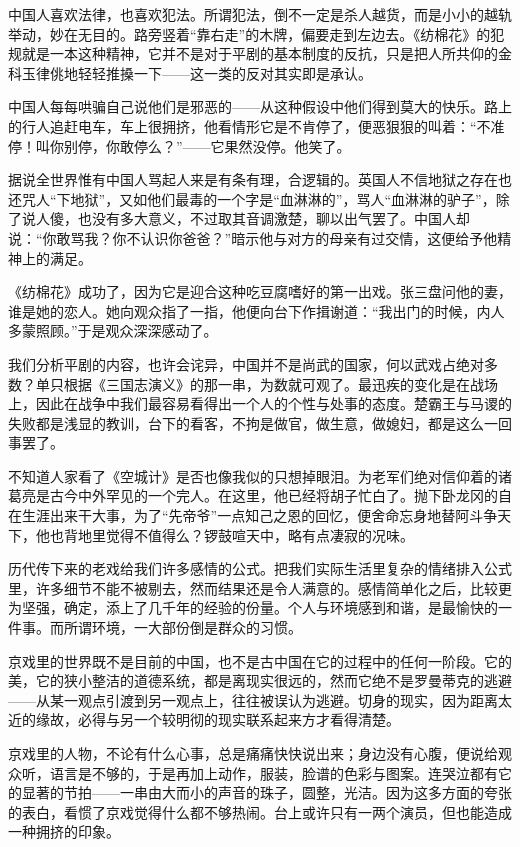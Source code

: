 \par 中国人喜欢法律，也喜欢犯法。所谓犯法，倒不一定是杀人越货，而是小小的越轨举动，妙在无目的。路旁竖着“靠右走”的木牌，偏要走到左边去。《纺棉花》的犯规就是一本这种精神，它并不是对于平剧的基本制度的反抗，只是把人所共仰的金科玉律佻地轻轻推搡一下——这一类的反对其实即是承认。
\par 中国人每每哄骗自己说他们是邪恶的——从这种假设中他们得到莫大的快乐。路上的行人追赶电车，车上很拥挤，他看情形它是不肯停了，便恶狠狠的叫着：“不准停！叫你别停，你敢停么？”——它果然没停。他笑了。
\par 据说全世界惟有中国人骂起人来是有条有理，合逻辑的。英国人不信地狱之存在也还咒人“下地狱”，又如他们最毒的一个字是“血淋淋的”，骂人“血淋淋的驴子”，除了说人傻，也没有多大意义，不过取其音调激楚，聊以出气罢了。中国人却说：“你敢骂我？你不认识你爸爸？”暗示他与对方的母亲有过交情，这便给予他精神上的满足。
\par 《纺棉花》成功了，因为它是迎合这种吃豆腐嗜好的第一出戏。张三盘问他的妻，谁是她的恋人。她向观众指了一指，他便向台下作揖谢道：“我出门的时候，内人多蒙照顾。”于是观众深深感动了。
\par 我们分析平剧的内容，也许会诧异，中国并不是尚武的国家，何以武戏占绝对多数？单只根据《三国志演义》的那一串，为数就可观了。最迅疾的变化是在战场上，因此在战争中我们最容易看得出一个人的个性与处事的态度。楚霸王与马谡的失败都是浅显的教训，台下的看客，不拘是做官，做生意，做媳妇，都是这么一回事罢了。
\par 不知道人家看了《空城计》是否也像我似的只想掉眼泪。为老军们绝对信仰着的诸葛亮是古今中外罕见的一个完人。在这里，他已经将胡子忙白了。抛下卧龙冈的自在生涯出来干大事，为了“先帝爷”一点知己之恩的回忆，便舍命忘身地替阿斗争天下，他也背地里觉得不值得么？锣鼓喧天中，略有点凄寂的况味。
\par 历代传下来的老戏给我们许多感情的公式。把我们实际生活里复杂的情绪排入公式里，许多细节不能不被剔去，然而结果还是令人满意的。感情简单化之后，比较更为坚强，确定，添上了几千年的经验的份量。个人与环境感到和谐，是最愉快的一件事。而所谓环境，一大部份倒是群众的习惯。
\par 京戏里的世界既不是目前的中国，也不是古中国在它的过程中的任何一阶段。它的美，它的狭小整洁的道德系统，都是离现实很远的，然而它绝不是罗曼蒂克的逃避——从某一观点引渡到另一观点上，往往被误认为逃避。切身的现实，因为距离太近的缘故，必得与另一个较明彻的现实联系起来方才看得清楚。
\par 京戏里的人物，不论有什么心事，总是痛痛快快说出来；身边没有心腹，便说给观众听，语言是不够的，于是再加上动作，服装，脸谱的色彩与图案。连哭泣都有它的显著的节拍——一串由大而小的声音的珠子，圆整，光洁。因为这多方面的夸张的表白，看惯了京戏觉得什么都不够热闹。台上或许只有一两个演员，但也能造成一种拥挤的印象。
